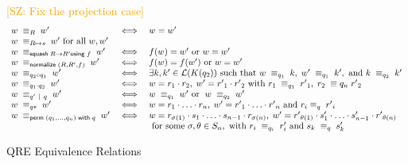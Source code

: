 \documentclass{svproc}
\newcommand{\FINISH}[3]{\ifdraft\textcolor{#1}{[#2: #3]}\fi}
\newcommand{\saz}[1]{\FINISH{orange}{SZ}{#1}}
\newcommand{\kw}[1]{\ensuremath{\mathsf{#1}}}
\newcommand{\squash}[3]{\ensuremath{\kw{squash} \; #1 \rightarrow #2
\kw{using} \; #3}}
\newcommand{\perm}[2]{\ensuremath{\kw{perm}\; (#1)\; \kw{with}\; #2}}
\newcommand{\normalize}[3]{\ensuremath{\kw{normalize} \; (#1, #2, #3)}}
\newcommand{\sep}{\ensuremath{\ | \ }}
\begin{document}
\begin{figure}[t]
  \centering
\saz{Fix the projection case}
\[
    \begin{array}{l@{\quad}l@{\quad}l} 
      w \; \equiv_R \; w' &\iff& w = w' \\
      w \; \equiv_{R \mapsto s} \; w' \text{ for all }w, w'\\
      w \; \equiv_{\squash{R}{R'}{f}} \; w' &\iff& f(w) = w'
      \text{ or } w = w' \\
      w \; \equiv_{\normalize{R}{R'}{f}} \; w' &\iff&
      f(w)=f(w') \text{ or }w = w'\\
      w \; \equiv_{q_2 \circ q_1} \; w' &\iff& \exists k, k' \in
  \mathcal{L}(K(q_2)) \text{ such that } w \; \equiv_{q_1} \; k, \; w' \;
  \equiv_{q_1} \; k', \text{ and } k \; \equiv_{q_2} \; k'\\
      w \; \equiv_{q_1 \cdot q_2} \; w'  &\iff& w = r_1
      \cdot r_2, \; w' = {r'}_1 \cdot {r'}_2 \text{ with } r_1 \; \equiv_{q_1}
      \; {r'}_1, \; r_2 \; \equiv{q_n} \; {r'}_2\\
      w \; \equiv_{q' \sep q} \; w' &\iff& w \; \equiv_{q_1} \; w'
      \text{ or } \; w \; \equiv_{q_2} \; w'\\
      w \; \equiv_{q*} \; w' &\iff& w = r_1 \cdot \ldots \cdot r_n, \; w'
      = {r'}_1 \cdot \ldots \cdot {r'}_n \text{ and } r_i \equiv_{q} \; {r'}_i
      \\
      w \; \equiv_{\perm{q_1, \ldots, q_n}{q}} \; w' &\iff& w = r_{\sigma(1)}
      \cdot s_1 \cdot \ldots \cdot s_{n-1} \cdot r_{\sigma(n)}, \;
    w' = {r'}_{\theta(1)} \cdot s'_1 \cdot \ldots \cdot s'_{n-1}
    \cdot {r'}_{\theta(n)} \\
    & & \text{ for some } \sigma, \theta \in S_n, \text{ with } r_i \;
    \equiv_{q_i} \; r'_i \text{ and } s_k \; \equiv_{q} \; s'_{k}
    \end{array}
    \]
  \caption{QRE Equivalence Relations}
  \label{fig:relations}
\end{figure}
\end{document}
